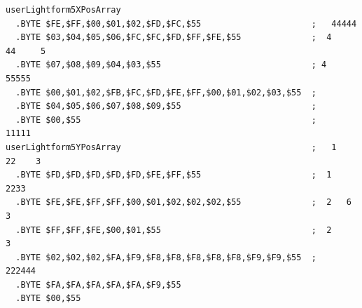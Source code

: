 \begin{minipage}[b]{0.68\linewidth}
\begin{lrbox}{\mybox}%
\hspace{1cm}
\begin{lstlisting}[basicstyle=\ttfamily\tiny,escapechar=\%]
userLightform5XPosArray
  .BYTE $FE,$FF,$00,$01,$02,$FD,$FC,$55                      ;   44444        
  .BYTE $03,$04,$05,$06,$FC,$FC,$FD,$FF,$FE,$55              ;  4     44     5
  .BYTE $07,$08,$09,$04,$03,$55                              ; 4        55555 
  .BYTE $00,$01,$02,$FB,$FC,$FD,$FE,$FF,$00,$01,$02,$03,$55  ;                
  .BYTE $04,$05,$06,$07,$08,$09,$55                          ;                
  .BYTE $00,$55                                              ;    11111       
userLightform5YPosArray                                      ;   1     22    3
  .BYTE $FD,$FD,$FD,$FD,$FD,$FE,$FF,$55                      ;  1        2233 
  .BYTE $FE,$FE,$FF,$FF,$00,$01,$02,$02,$02,$55              ;  2   6   3     
  .BYTE $FF,$FF,$FE,$00,$01,$55                              ;  2      3      
  .BYTE $02,$02,$02,$FA,$F9,$F8,$F8,$F8,$F8,$F8,$F9,$F9,$55  ;   222444       
  .BYTE $FA,$FA,$FA,$FA,$FA,$F9,$55
  .BYTE $00,$55
\end{lstlisting}
\end{lrbox}%
\scalebox{0.8}{\usebox{\mybox}}

\end{minipage}
%
%
